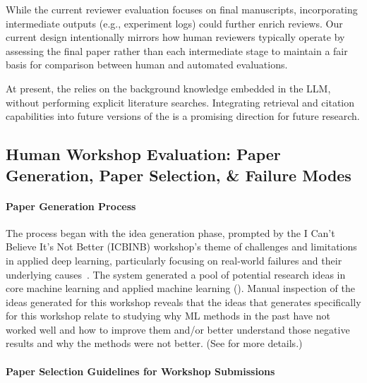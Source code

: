 \begin{appendices}
While the current reviewer evaluation focuses on final manuscripts, incorporating intermediate outputs (e.g., experiment logs) could further enrich reviews.
Our current design intentionally mirrors how human reviewers typically operate by assessing the final paper rather than each intermediate stage to maintain a fair basis for comparison between human and automated evaluations.

At present, the \ourreviewer relies on the background knowledge embedded in the LLM, without performing explicit literature searches.
Integrating retrieval and citation capabilities into future versions of the \ourreviewer is a promising direction for future research.

\subsection{Human Workshop Evaluation: Paper Generation, Paper Selection, \& Failure Modes}
\label{app:filtering}

\paragraph{Paper Generation Process}
The process began with the idea generation phase, prompted by the I Can't Believe It's Not Better (ICBINB) workshop's theme of challenges and limitations in applied deep learning, particularly focusing on real-world failures and their underlying causes~\citep{iclr2025icbinb}.
The system generated a pool of potential research ideas in core machine learning and applied machine learning ().
Manual inspection of the ideas generated for this workshop reveals that the ideas that \ouralgo generates specifically for this workshop relate to studying why ML methods in the past have not worked well and how to improve them and/or better understand those negative results and why the methods were not better. (See  for more details.)


\paragraph{Paper Selection Guidelines for Workshop Submissions}


\end{appendices}
